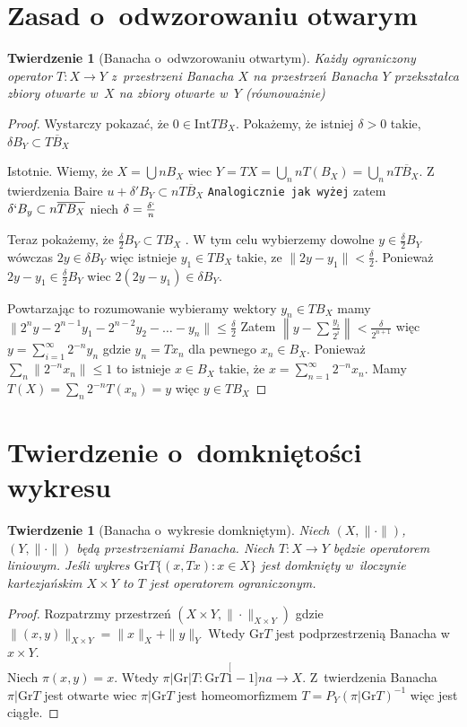 \documentclass[11pt]{mwrep}
\renewcommand{\[}{\begin{equation}}
\renewcommand{\]}{\end{equation}}
\newcommand{\norm}{\|\cdot\|}
\newcommand{\gr}{\mathrm{Gr}}
\newtheorem{twr}[subsection]{Twierdzenie}%
\begin{document}
\section{Zasad o~odwzorowaniu otwarym}
\begin{twr}[Banacha o~odwzorowaniu otwartym]
	Każdy ograniczony operator $T \colon X \to Y$ z~przestrzeni Banacha $X$ na przestrzeń Banacha $Y$
	przekształca zbiory otwarte w~$X$  na zbiory otwarte w~$Y$ (równoważnie)
\end{twr}
\begin{proof}
	Wystarczy pokazać, że $0 \in \mathrm{Int} TB_X$.
	Pokażemy, że istniej $\delta >0$ takie, $\delta B_Y \subset \overline{TB_{X}}$ \par
	Istotnie. Wiemy, że $X = \bigcup n B_X $ wiec $Y =TX = \bigcup_n n T(B_X) = \bigcup_n n \overline{TB_X}$.
	Z twierdzenia Baire $u + \delta' B_Y \subset n \overline{TB_X}$
	\texttt{Analogicznie jak wyżej}
	zatem $\delta`B_y \subset n \overline{T B_X}$ niech $\delta  = \frac{\delta`}{n}$\par
	Teraz pokażemy, że $\frac{\delta}{2}B_Y \subset TB_X$ .
	W tym celu wybierzemy dowolne $y \in \frac{\delta}{2} B_Y$ wówczas $2y \in \delta B_Y$ więc istnieje $y_1 \in TB_X$ takie, ze 
	$\|2y - y_1 \| < \frac{\delta}{2}$. Ponieważ $2y - y_1 \in \frac{\delta}{2} B_Y$ wiec $2(2y - y_1) \in \delta B_Y$.\par
	Powtarzając to rozumowanie wybieramy wektory $y_n \in TB_X$ mamy 
	$\|2^n y - 2^{n-1}y_{1} - 2^{n-2}y_2 - \ldots -y_n \| \le \frac{\delta}{2}$
	Zatem $\left\| y - \sum \frac{y_i}{2^i}\right\| < \frac{\delta}{2^{n+1}}$ więc 
	$y = \sum_{i=1}^\infty 2^{-n}y_n$ gdzie $y_n = T x_n $ dla pewnego $x_n \in B_X$.
	Ponieważ $\sum_n \|2^{-n} x_n\| \le 1$ to istnieje $x \in B_X$ takie, że $x= \sum_{n=1}^\infty 2^{-n}x_n$. 
	Mamy $T(X) = \sum_n 2^{-n}T(x_n) = y$ więc $y\in TB_X$
\end{proof}
\section{Twierdzenie o~domkniętości wykresu}
\begin{twr}[Banacha o~wykresie domkniętym]
	Niech $(X,\norm)$, $(Y, \norm)$ będą przestrzeniami Banacha. 
	Niech $T\colon X \to Y$ będzie operatorem liniowym. Jeśli wykres $\mathrm{Gr}T\{(x,Tx): x\in X\}$ jest domknięty w~iloczynie kartezjańskim  $X \times Y$ 
	to $T$ jest operatorem ograniczonym.	
\end{twr}
\begin{proof}
	Rozpatrzmy przestrzeń $(X\times Y, \|\cdot\|_{X\times Y})$ gdzie $\|(x,y)\|_{X\times Y} = \|x\|_X + \|y\|_Y$ 
	Wtedy $\gr T$ jest podprzestrzenią Banacha w~$x\times Y$.\\
	Niech $\pi(x,y) = x$. Wtedy $\pi|\gr|T\colon \gr T \stackrel[1-1]{na}{\to} X$.
	Z~twierdzenia Banacha $\pi|\gr T$ jest otwarte wiec $\pi |\gr T$ jest homeomorfizmem $T= P_Y (\pi |\gr T)^{-1}$ więc jest ciągłe. 
\end{proof}
\end{document}
